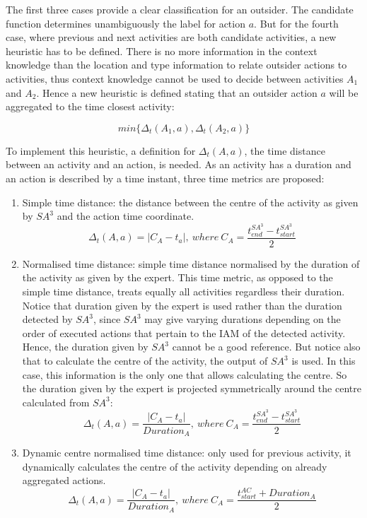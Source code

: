 The first three cases provide a clear classification for an outsider. The candidate function determines unambiguously the label for action $a$. But for the fourth case, where previous and next activities are both candidate activities, a new heuristic has to be defined. There is no more information in the context knowledge than the location and type information to relate outsider actions to activities, thus context knowledge cannot be used to decide between activities $A_1$ and $A_2$. Hence a new heuristic is defined stating that an outsider action $a$ will be aggregated to the time closest activity:

\begin{equation}
 min\{\Delta_t(A_1, a), \Delta_t(A_2, a)\}
\end{equation}

To implement this heuristic, a definition for $\Delta_t(A, a)$, the time distance between an activity and an action, is needed. As an activity has a duration and an action is described by a time instant, three time metrics are proposed:

\begin{enumerate}
 \item Simple time distance: the distance between the centre of the activity as given by $SA^3$ and the action time coordinate.
 \begin{equation}
 \label{eq-t1}
  \Delta_t(A, a) = | C_A - t_a |,\ where \ C_A = \frac{t_{end} ^{SA^3} - t_{start} ^{SA^3}}{2}
 \end{equation}
 \item Normalised time distance: simple time distance normalised by the duration of the activity as given by the expert. This time metric, as opposed to the simple time distance, treats equally all activities regardless their duration. Notice that duration given by the expert is used rather than the duration detected by $SA^3$, since $SA^3$ may give varying durations depending on the order of executed actions that pertain to the IAM of the detected activity. Hence, the duration given by $SA^3$ cannot be a good reference. But notice also that to calculate the centre of the activity, the output of $SA^3$ is used. In this case, this information is the only one that allows calculating the centre. So the duration given by the expert is projected symmetrically around the centre calculated from $SA^3$:
 \begin{equation}
 \label{eq-t2}
  \Delta_t(A, a) = \frac{| C_A - t_a |}{Duration_A} ,\ where \ C_A = \frac{t_{end} ^{SA^3} - t_{start} ^{SA^3}}{2}
 \end{equation}
 \item Dynamic centre normalised time distance: only used for previous activity, it dynamically calculates the centre of the activity depending on already aggregated actions.
 \begin{equation}
 \label{eq-t3}
  \Delta_t(A, a) = \frac{| C_A - t_a |}{Duration_A} ,\ where \ C_A = \frac{t_{start} ^{AC} + Duration_A}{2}
 \end{equation}
\end{enumerate}

